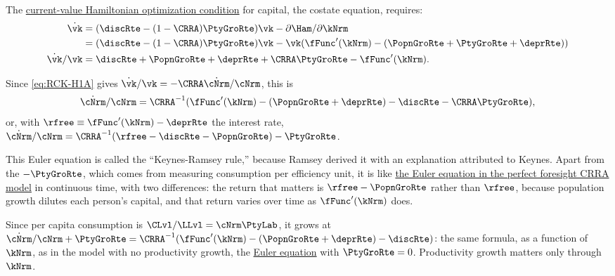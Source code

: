 \documentclass{econark}
\begin{document}
The \href{https://en.wikipedia.org/wiki/Hamiltonian_(control_theory)#Example:_Ramsey\%E2\%80\%93Cass\%E2\%80\%93Koopmans_model}{current-value Hamiltonian optimization condition} for capital, the costate equation, requires:
\begin{equation}\begin{gathered}\begin{aligned}
  \dot{\vk} & =  (\discRte-(1-\CRRA)\PtyGroRte)\vk - \partial \Ham/\partial \kNrm  \\
                & =  (\discRte-(1-\CRRA)\PtyGroRte)\vk - \vk (\fFunc^{\prime}(\kNrm) - (\PopnGroRte+\PtyGroRte+\deprRte))  \\
  \dot{\vk}/{\vk} & =  \discRte+\PopnGroRte+\deprRte+\CRRA \PtyGroRte-\fFunc^{\prime}(\kNrm) .
\end{aligned}\end{gathered}\end{equation}

Since \eqref{eq:RCK-H1A} gives $\dot{\vk}/\vk = -\CRRA\dot{\cNrm}/\cNrm$, this is
\begin{equation}
  \dot{\cNrm}/\cNrm = \CRRA^{-1}(\fFunc^{\prime}(\kNrm)-(\PopnGroRte+\deprRte)-\discRte - \CRRA \PtyGroRte), \label{eq:cdotOc}
\end{equation}
or, with $\rfree \equiv \fFunc^{\prime}(\kNrm) - \deprRte$ the interest rate, $\dot{\cNrm}/\cNrm = \CRRA^{-1}(\rfree - \discRte - \PopnGroRte) - \PtyGroRte$.

This Euler equation is called the ``Keynes-Ramsey rule,'' because Ramsey derived it
with an explanation attributed to Keynes.
Apart from the $-\PtyGroRte$, which comes from measuring consumption per efficiency unit, it is like \href{https://intertemporal-choice.github.io/content/consumption/perfforesightcrra/#eq-pfcrra-cgrow}{the Euler equation in the perfect foresight CRRA model} in continuous time, with two differences: the return that matters is $\rfree-\PopnGroRte$ rather than $\rfree$, because population growth dilutes each person's capital, and that return varies over time as $\fFunc^{\prime}(\kNrm)$ does.

Since per capita consumption is $\CLvl/\LLvl = \cNrm \PtyLab$, it grows at $\dot{\cNrm}/\cNrm + \PtyGroRte = \CRRA^{-1}(\fFunc^{\prime}(\kNrm)-(\PopnGroRte+\deprRte)-\discRte)$: the same formula, as a function of $\kNrm$, as in the model with no productivity growth, the \hyperref[eq:cdotOc]{Euler equation} with $\PtyGroRte=0$. Productivity growth matters only through $\kNrm$.
\end{document}
